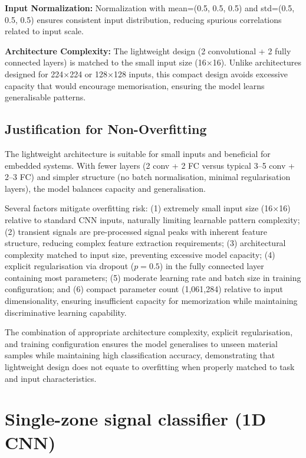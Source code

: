 \documentclass[12pt,a4paper,oneside]{report}
\let\oldsection\section
\renewcommand{\section}{\clearpage\oldsection}
\begin{document}
\textbf{Input Normalization:} Normalization with mean=(0.5, 0.5, 0.5) and std=(0.5, 0.5, 0.5) ensures consistent input distribution, reducing spurious correlations related to input scale.

\textbf{Architecture Complexity:} The lightweight design (2 convolutional + 2 fully connected layers) is matched to the small input size (16×16). Unlike architectures designed for 224×224 or 128×128 inputs, this compact design avoids excessive capacity that would encourage memorisation, ensuring the model learns generalisable patterns.

\subsection{Justification for Non-Overfitting}

The lightweight architecture is suitable for small inputs and beneficial for embedded systems. With fewer layers (2 conv + 2 FC versus typical 3--5 conv + 2--3 FC) and simpler structure (no batch normalisation, minimal regularisation layers), the model balances capacity and generalisation.

Several factors mitigate overfitting risk: (1) extremely small input size (16×16) relative to standard CNN inputs, naturally limiting learnable pattern complexity; (2) transient signals are pre-processed signal peaks with inherent feature structure, reducing complex feature extraction requirements; (3) architectural complexity matched to input size, preventing excessive model capacity; (4) explicit regularisation via dropout ($p=0.5$) in the fully connected layer containing most parameters; (5) moderate learning rate and batch size in training configuration; and (6) compact parameter count (1,061,284) relative to input dimensionality, ensuring insufficient capacity for memorization while maintaining discriminative learning capability.

The combination of appropriate architecture complexity, explicit regularisation, and training configuration ensures the model generalises to unseen material samples while maintaining high classification accuracy, demonstrating that lightweight design does not equate to overfitting when properly matched to task and input characteristics.

\newpage
\section{Single-zone signal classifier (1D CNN)}
\label{sec:single_zone_signal_classifier}
\end{document}
